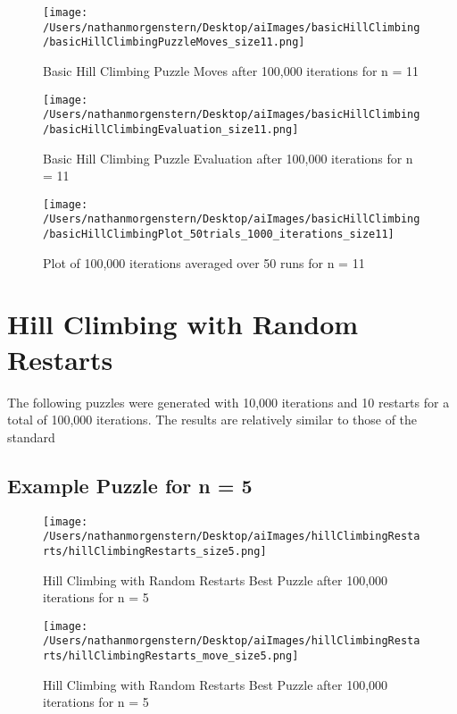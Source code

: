 \documentclass{report}
\begin{document}
	\begin{figure}[H]
	\centering
	\texttt{[image: /Users/nathanmorgenstern/Desktop/aiImages/basicHillClimbing/basicHillClimbingPuzzleMoves\_size11.png]}
	\caption{Basic Hill Climbing Puzzle Moves  after 100,000 iterations for n = 11} 
	\label{fig: Basic Hill Climbing Puzzle Moves after 100,000 iterations for n = 11}
	\end{figure}

	\begin{figure}[H]
	\centering
	\texttt{[image: /Users/nathanmorgenstern/Desktop/aiImages/basicHillClimbing/basicHillClimbingEvaluation\_size11.png]}
	\caption{Basic Hill Climbing Puzzle Evaluation after 100,000 iterations for n = 11} 
	\label{fig: Basic Hill Climbing Puzzle Evaluation after 100,000 iterations for n = 11}
	\end{figure}

	\begin{figure}[H]
	\centering
	\texttt{[image: /Users/nathanmorgenstern/Desktop/aiImages/basicHillClimbing/basicHillClimbingPlot\_50trials\_1000\_iterations\_size11]}
	\caption{Plot of 100,000 iterations averaged over 50 runs for n = 11}
	\label{fig: Plot of 100,000 iterations averaged over 50 runs for n = 11}
	\end{figure}

\newpage
\section{Hill Climbing with Random Restarts}
The following puzzles were generated with 10,000 iterations and 10 restarts for a total of 100,000 iterations. The results are relatively similar to those of the standard 

\subsection{Example Puzzle for n = 5}

	\begin{figure}[H]
	\centering
	\texttt{[image: /Users/nathanmorgenstern/Desktop/aiImages/hillClimbingRestarts/hillClimbingRestarts\_size5.png]}
	\caption{Hill Climbing with Random Restarts Best Puzzle after 100,000 iterations for n = 5} 
	\label{fig: Hill Climbing with Random Restarts Best Puzzle after 100,000 iterations for n = 5}
	\end{figure}
	
	\begin{figure}[H]
	\centering
	\texttt{[image: /Users/nathanmorgenstern/Desktop/aiImages/hillClimbingRestarts/hillClimbingRestarts\_move\_size5.png]}
	\caption{Hill Climbing with Random Restarts Best Puzzle after 100,000 iterations for n = 5} 
	\label{fig: Hill Climbing with Random Restarts Best Puzzle after 100,000 iterations for n = 5}
	\end{figure}
\end{document}
